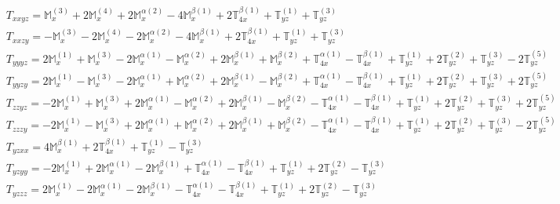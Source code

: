 \documentclass[fleqn,8pt,landscape]{jsarticle}
\begin{document}
\begin{align*}
& T_{xxyz} = \mathbb{M}_{x}^{(3)} + 2 \mathbb{M}_{x}^{(4)} + 2 \mathbb{M}_{x}^{\alpha(2)} - 4 \mathbb{M}_{x}^{\beta(1)} + 2 \mathbb{T}_{4x}^{\beta(1)} + \mathbb{T}_{yz}^{(1)} + \mathbb{T}_{yz}^{(3)} \\
& T_{xxzy} = - \mathbb{M}_{x}^{(3)} - 2 \mathbb{M}_{x}^{(4)} - 2 \mathbb{M}_{x}^{\alpha(2)} - 4 \mathbb{M}_{x}^{\beta(1)} + 2 \mathbb{T}_{4x}^{\beta(1)} + \mathbb{T}_{yz}^{(1)} + \mathbb{T}_{yz}^{(3)} \\
& T_{yyyz} = 2 \mathbb{M}_{x}^{(1)} + \mathbb{M}_{x}^{(3)} - 2 \mathbb{M}_{x}^{\alpha(1)} - \mathbb{M}_{x}^{\alpha(2)} + 2 \mathbb{M}_{x}^{\beta(1)} + \mathbb{M}_{x}^{\beta(2)} + \mathbb{T}_{4x}^{\alpha(1)} - \mathbb{T}_{4x}^{\beta(1)} + \mathbb{T}_{yz}^{(1)} + 2 \mathbb{T}_{yz}^{(2)} + \mathbb{T}_{yz}^{(3)} - 2 \mathbb{T}_{yz}^{(5)} \\
& T_{yyzy} = 2 \mathbb{M}_{x}^{(1)} - \mathbb{M}_{x}^{(3)} - 2 \mathbb{M}_{x}^{\alpha(1)} + \mathbb{M}_{x}^{\alpha(2)} + 2 \mathbb{M}_{x}^{\beta(1)} - \mathbb{M}_{x}^{\beta(2)} + \mathbb{T}_{4x}^{\alpha(1)} - \mathbb{T}_{4x}^{\beta(1)} + \mathbb{T}_{yz}^{(1)} + 2 \mathbb{T}_{yz}^{(2)} + \mathbb{T}_{yz}^{(3)} + 2 \mathbb{T}_{yz}^{(5)} \\
& T_{zzyz} = - 2 \mathbb{M}_{x}^{(1)} + \mathbb{M}_{x}^{(3)} + 2 \mathbb{M}_{x}^{\alpha(1)} - \mathbb{M}_{x}^{\alpha(2)} + 2 \mathbb{M}_{x}^{\beta(1)} - \mathbb{M}_{x}^{\beta(2)} - \mathbb{T}_{4x}^{\alpha(1)} - \mathbb{T}_{4x}^{\beta(1)} + \mathbb{T}_{yz}^{(1)} + 2 \mathbb{T}_{yz}^{(2)} + \mathbb{T}_{yz}^{(3)} + 2 \mathbb{T}_{yz}^{(5)} \\
& T_{zzzy} = - 2 \mathbb{M}_{x}^{(1)} - \mathbb{M}_{x}^{(3)} + 2 \mathbb{M}_{x}^{\alpha(1)} + \mathbb{M}_{x}^{\alpha(2)} + 2 \mathbb{M}_{x}^{\beta(1)} + \mathbb{M}_{x}^{\beta(2)} - \mathbb{T}_{4x}^{\alpha(1)} - \mathbb{T}_{4x}^{\beta(1)} + \mathbb{T}_{yz}^{(1)} + 2 \mathbb{T}_{yz}^{(2)} + \mathbb{T}_{yz}^{(3)} - 2 \mathbb{T}_{yz}^{(5)} \\
& T_{yzxx} = 4 \mathbb{M}_{x}^{\beta(1)} + 2 \mathbb{T}_{4x}^{\beta(1)} + \mathbb{T}_{yz}^{(1)} - \mathbb{T}_{yz}^{(3)} \\
& T_{yzyy} = - 2 \mathbb{M}_{x}^{(1)} + 2 \mathbb{M}_{x}^{\alpha(1)} - 2 \mathbb{M}_{x}^{\beta(1)} + \mathbb{T}_{4x}^{\alpha(1)} - \mathbb{T}_{4x}^{\beta(1)} + \mathbb{T}_{yz}^{(1)} + 2 \mathbb{T}_{yz}^{(2)} - \mathbb{T}_{yz}^{(3)} \\
& T_{yzzz} = 2 \mathbb{M}_{x}^{(1)} - 2 \mathbb{M}_{x}^{\alpha(1)} - 2 \mathbb{M}_{x}^{\beta(1)} - \mathbb{T}_{4x}^{\alpha(1)} - \mathbb{T}_{4x}^{\beta(1)} + \mathbb{T}_{yz}^{(1)} + 2 \mathbb{T}_{yz}^{(2)} - \mathbb{T}_{yz}^{(3)} \\

\end{align*}
\end{document}
